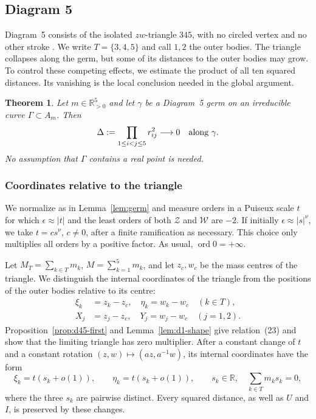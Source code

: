 \documentclass[11pt]{amsart}
\newtheorem{theorem}{Theorem}[section]
\theoremstyle{definition}
\theoremstyle{remark}
\newcommand{\R}{\mathbb{R}}
\newcommand{\Rp}{\mathbb{R}_{>0}}
\newcommand{\ord}{\operatorname{ord}}
\begin{document}
{
\subsection{Diagram 5}\label{sec:d5}

Diagram~5 consists of the isolated $zw$-triangle $345$, with no circled vertex and no
other stroke \cite[\S7.4 and Fig.~11]{AK}.  We write $T=\{3,4,5\}$ and call $1,2$
the outer bodies.  The triangle collapses along the germ, but some of its
distances to the outer bodies may grow.  To control these competing effects,
we estimate the product of all ten squared distances.  Its vanishing is the
local conclusion needed in the global argument.

\begin{theorem}\label{thm:d5}
Let $m\in\Rp^5$ and let $\gamma$ be a Diagram~5 germ on an irreducible curve
$\Gamma\subset A_m$.  Then
\[
 \Delta:=\prod_{1\le i<j\le5}r_{ij}^{2}\longrightarrow0
 \quad\hbox{along }\gamma.
\]
No assumption that $\Gamma$ contains a real point is needed.
\end{theorem}

\subsubsection{Coordinates relative to the triangle}\label{d5-frame}
We normalize as in Lemma~\ref{lem:germ} and measure orders in a Puiseux scale $t$ for
which $\epsilon\approx|t|$ and the least orders of both $\mathcal Z$ and
$\mathcal W$ are $-2$.  If initially $\epsilon\approx|s|^\nu$, we take
$t=cs^\nu$, $c\ne0$, after a finite ramification as necessary.  This choice only
multiplies all orders by a positive factor.  As usual, $\ord0=+\infty$.

Let $M_T=\sum_{k\in T}m_k$, $M=\sum_{k=1}^5m_k$, and let $z_c,w_c$ be the
mass centres of the triangle.  We distinguish the internal coordinates of
the triangle from the positions of the outer bodies relative to its centre:
\[
 \begin{aligned}
 \xi_k&=z_k-z_c,\quad \eta_k=w_k-w_c\quad(k\in T),\\
 X_j&=z_j-z_c,\quad Y_j=w_j-w_c\quad(j=1,2).
 \end{aligned}
\]
Proposition~\ref{prop:d45-first} and Lemma~\ref{lem:d1-shape} give relation~(23)
and show that the limiting triangle has zero multiplier.  After a constant
change of $t$ and a constant rotation $(z,w)\mapsto(az,a^{-1}w)$, its internal
coordinates have the form
\begin{equation}\label{d5-eq-offsets}
 \xi_k=t(s_k+o(1)),\qquad \eta_k=t(s_k+o(1)),\qquad
 s_k\in\R,\quad \sum_{k\in T}m_ks_k=0,
\end{equation}
where the three $s_k$ are pairwise distinct.  Every squared distance, as well
as $U$ and $I$, is preserved by these changes.

}
\end{document}
